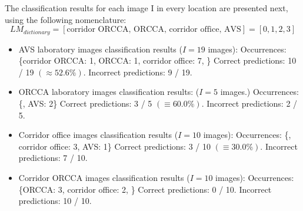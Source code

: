 The classification results for each image I in every location are presented next, 
using the following nomenclature:
$$LM_{dictionary} =  [\textrm{corridor ORCCA, ORCCA, corridor office, AVS}] = [0, 1, 2, 3]$$
\begin{itemize}
	\item{AVS laboratory images classification results ($I = 19$ images): } \newline
	[ 2,  2,  3,  3,  3,  3,  3, 3,  2,  2,  3,  3,  2,  3,  0,  2,  3, 1, 2 ] \newline
	Occurrences: \{corridor ORCCA: 1, ORCCA: 1, corridor office: 7, \}\newline
	Correct predictions: 10 / 19 $(\approx 52.6\%)$.\newline
	Incorrect predictions: 9 / 19.
	\item{ORCCA laboratory images classification results: ($I = 5$ images.)}\newline
	[ 1,  1,  3,  1,  3 ] \newline
	Occurrences:  \{,  AVS: 2\} \newline
	Correct predictions: 3 / 5 $(\equiv 60.0\%)$.\newline
	Incorrect predictions: 2 / 5.
	\item{Corridor office images classification results ($I = 10$ images): }\newline
	[ 1,  3,  1,  2,  1,  1,  1,  2,  1,  2 ]\newline
	Occurrences:  \{, corridor office: 3, AVS: 1\} \newline
	Correct predictions: 3 / 10 $(\equiv 30.0\%)$.\newline
	Incorrect predictions: 7 / 10.
	\item{Corridor ORCCA images classification results ($I = 10$ images):}\newline
	[ 3,  3,  2,  1,  2,  3,  3,  3,  1,  1 ]\newline
	Occurrences:  \{ORCCA: 3, corridor office: 2,  \} \newline
	Correct predictions: 0 / 10.\newline
	Incorrect predictions: 10 / 10.
\end{itemize}

